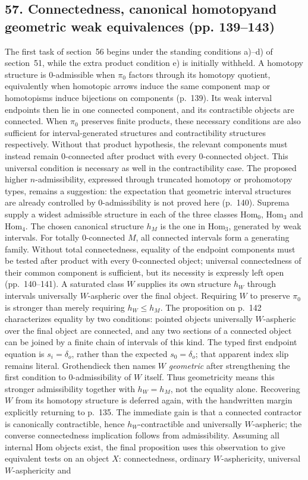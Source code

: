 \documentclass[10pt,oneside]{book}
\begin{document}
\subsection*{57. Connectedness, canonical homotopy\newline and geometric weak equivalences (pp. 139--143)}
The first task of section~56 begins under the standing conditions a)--d) of section~51, while the extra product condition e) is initially withheld. A homotopy structure is $0$-admissible when $\pi_0$ factors through its homotopy quotient, equivalently when homotopic arrows induce the same component map or homotopisms induce bijections on components (p.~139). Its weak interval endpoints then lie in one connected component, and its contractible objects are connected. When $\pi_0$ preserves finite products, these necessary conditions are also sufficient for interval-generated structures and contractibility structures respectively. Without that product hypothesis, the relevant components must instead remain $0$-connected after product with every $0$-connected object. This universal condition is necessary as well in the contractibility case. The proposed higher $n$-admissibility, expressed through truncated homotopy or prohomotopy types, remains a suggestion: the expectation that geometric interval structures are already controlled by $0$-admissibility is not proved here (p.~140). Suprema supply a widest admissible structure in each of the three classes $\mathrm{Hom}_0$, $\mathrm{Hom}_3$ and $\mathrm{Hom}_4$. The chosen canonical structure $h_M$ is the one in $\mathrm{Hom}_3$, generated by weak intervals. For totally $0$-connected $M$, all connected intervals form a generating family. Without total connectedness, equality of the endpoint components must be tested after product with every $0$-connected object; universal connectedness of their common component is sufficient, but its necessity is expressly left open (pp.~140--141). A saturated class $W$ supplies its own structure $h_W$ through intervals universally $W$-aspheric over the final object. Requiring $W$ to preserve $\pi_0$ is stronger than merely requiring $h_W\leq h_M$. The proposition on p.~142 characterizes equality by two conditions: pointed objects universally $W$-aspheric over the final object are connected, and any two sections of a connected object can be joined by a finite chain of intervals of this kind. The typed first endpoint equation is $s_i=\delta_o$, rather than the expected $s_0=\delta_o$; that apparent index slip remains literal. Grothendieck then names $W$ \emph{geometric} after strengthening the first condition to $0$-admissibility of $W$ itself. Thus geometricity means this stronger admissibility together with $h_W=h_M$, not the equality alone. Recovering $W$ from its homotopy structure is deferred again, with the handwritten margin explicitly returning to p.~135. The immediate gain is that a connected contractor is canonically contractible, hence $h_W$-contractible and universally $W$-aspheric; the converse connectedness implication follows from admissibility. Assuming all internal Hom objects exist, the final proposition uses this observation to give equivalent tests on an object $X$: connectedness, ordinary $W$-asphericity, universal $W$-asphericity and 
\end{document}
